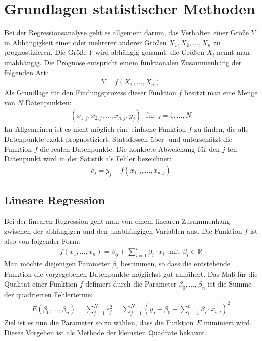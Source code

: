 \chapter{Grundlagen statistischer Methoden}

Bei der Regressionsanalyse geht es allgemein darum, das Verhalten einer Größe $Y$ in Abhängigkeit einer oder mehrerer anderer Größen $X_1, X_2, \dots, X_n$ zu prognostizieren. Die Größe $Y$ wird abhängig genannt, die Größen $X_i$ nennt man unabhängig. Die Prognose entspricht einem funktionalen Zusammenhang der folgenden Art:
\begin{align*}
    Y = f(X_1, \dots, X_n)
\end{align*}
Als Grundlage für den Findungsprozess dieser Funktion $f$ besitzt man eine Menge von $N$ Datenpunkten:
\begin{align*}
    (x_{1, j}, x_{2, j}, \dots, x_{n, j}, y_j) ~~~ \text{für} ~~ j = 1, \dots, N
\end{align*}
Im Allgemeinen ist es nicht möglich eine einfache Funktion $f$ zu finden, die alle Datenpunkte exakt prognostiziert. Stattdessen über- und unterschätzt die Funktion $f$ die realen Datenpunkte. Die konkrete Abweichung für den $j$-ten Datenpunkt wird in der Satistik als Fehler bezeichnet:
\begin{align*}
    e_j = y_j - f(x_{1, j}, \dots, x_{n, j})
\end{align*}

\section{Lineare Regression}

Bei der linearen Regression geht man von einem linearen Zusammenhang zwischen der abhängigen und den unabhängigen Variablen aus. Die Funktion $f$ ist also von folgender Form:
\begin{align*}
    f(x_1, \dots, x_n) = \beta_0 + \sum_{i=1}^n \beta_i \cdot x_i ~~~ \text{mit} ~~ \beta_i \in \mathbb{R}
\end{align*}
Man möchte diejenigen Parameter $\beta_i$ bestimmen, so dass die entstehende Funktion die vorgegebenen Datenpunkte möglichst gut annähert. Das Maß für die Qualität einer Funktion $f$ definiert durch die Parameter $\beta_0, \dots, \beta_n$ ist die Summe der quadrierten Fehlerterme:
\begin{align*}
    E(\beta_0, \dots, \beta_n) = \sum_{j=1}^N e_j^2 = \sum_{j=1}^N \left( y_j - \beta_0 - \sum_{i=1}^n \beta_i \cdot x_{i, j} \right)^2
\end{align*}
Ziel ist es nun die Parameter so zu wählen, dass die Funktion $E$ miminiert wird. Dieses Vorgehen ist als Methode der kleinsten Quadrate bekannt.
